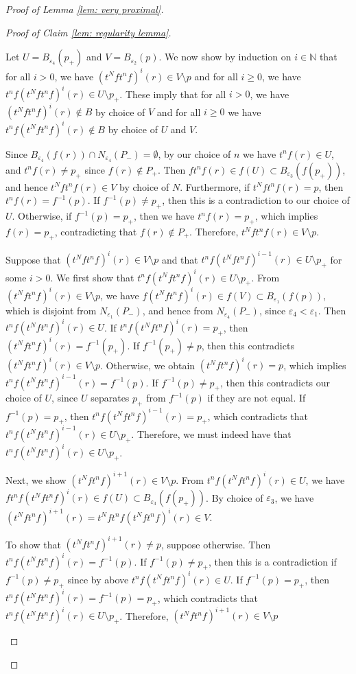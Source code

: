 \documentclass[12pt]{article}
\theoremstyle{definition}
\newcommand{\N}{\mathbb{N}}
\newcommand{\ve}{\varepsilon}
\begin{document}
\begin{proof} [Proof of Lemma \ref{lem: very proximal}]
\begin{proof}[Proof of Claim \ref{lem: regularity lemma}]
\begin{enumerate}
        Let $U = B_{\ve_4}(p_+)$ and $V = B_{\ve_2}(p)$. We now show by induction on $i \in \N$ that for all $i > 0$, we have $(t^Nft^nf)^i(r) \in V \setminus p$ and for all $i \geq 0$, we have $t^nf (t^Nft^nf)^i(r) \in U \setminus p_+$. These imply that for all $i > 0$, we have $(t^Nft^nf)^i(r) \notin B$ by choice of $V$ and for all $i \geq 0$ we have $t^n f(t^Nft^nf)^i(r) \notin B$ by choice of $U$ and $V$.

        Since $B_{\ve_4}(f(r)) \cap N_{\ve_4}(P_-) = \emptyset$, by our choice of $n$ we have $t^n f(r) \in U$, and $t^n f(r) \neq p_+$ since $f(r) \notin P_+$. Then $ft^nf(r) \in f(U) \subset B_{\ve_3}(f(p_+))$, and hence $t^N ft^nf(r) \in V$ by choice of $N$. Furthermore, if $t^N f t^n f(r) = p$, then $t^n f(r) = f^{-1}(p)$. If $f^{-1}(p) \neq p_+$, then this is a contradiction to our choice of $U$. Otherwise, if $f^{-1}(p) = p_+$, then we have $t^n f(r) = p_+$, which implies $f(r) = p_+$, contradicting that $f(r) \notin P_+$. Therefore, $t^Nft^n f(r) \in V \setminus p$. 

        Suppose that $(t^N f t^n f)^i(r) \in V \setminus p$ and that $t^n f(t^N f t^n f)^{i-1}(r) \in U \setminus p_+$ for some $i > 0$. We first show that $t^n f(t^N f t^n f)^{i}(r) \in U \setminus p_+$. From $(t^N f t^n f)^i(r) \in V \setminus p$, we have $f(t^N f t^n f)^i(r) \in f(V) \subset B_{\ve_1}(f(p))$, which is disjoint from $N_{\ve_1}(P_-)$, and hence from $N_{\ve_4}(P_-)$, since $\ve_4 < \ve_1$. Then $t^n f(t^N f t^n f)^i(r) \in U$. If $t^n f(t^N f t^n f)^i(r) = p_+$, then $(t^N f t^n f)^i(r) = f^{-1}(p_+)$. If $f^{-1}(p_+) \neq p$, then this contradicts $(t^N f t^n f)^i(r) \in V \setminus p$. Otherwise, we obtain $(t^N f t^n f)^i(r) = p$, which implies $t^n f (t^Nft^nf)^{i-1}(r) = f^{-1}(p)$. If $f^{-1}(p) \neq p_+$, then this contradicts our choice of $U$, since $U$ separates $p_+$ from $f^{-1}(p)$ if they are not equal. If $f^{-1}(p) = p_+$, then $t^n f (t^Nft^nf)^{i-1}(r) = p_+$, which contradicts that $t^n f(t^N f t^n f)^{i-1}(r) \in U \setminus p_+$. Therefore, we must indeed have that $t^n f(t^N f t^n f)^{i}(r) \in U \setminus p_+$.  
        
        Next, we show $(t^N f t^n f)^{i+1}(r) \in V \setminus p$. From $t^n f(t^N f t^n f)^{i}(r) \in U$, we have $ft^n f(t^N f t^n f)^i(r) \in f(U) \subset B_{\ve_3}(f(p_+))$. By choice of $\ve_3$, we have $(t^N f t^n f)^{i+1}(r) = t^Nft^n f(t^N f t^n f)^i(r) \in V$. 

        To show that $(t^N f t^n f)^{i+1}(r) \neq p$, suppose otherwise. Then $t^n f (t^N f t^n f)^{i}(r) = f^{-1}(p)$. If $f^{-1}(p) \neq p_+$, then this is a contradiction if $f^{-1}(p) \neq p_+$ since by above $t^n f (t^N f t^n f)^{i}(r) \in U$. If $f^{-1}(p) = p_+$, then $t^n f (t^N f t^n f)^{i}(r) = f^{-1}(p) = p_+$, which contradicts that $t^n f(t^N f t^n f)^{i}(r) \in U \setminus p_+$. Therefore, $(t^N f t^n f)^{i+1}(r) \in V \setminus p$


\end{enumerate}
\end{proof}
\end{proof}
\end{document}
